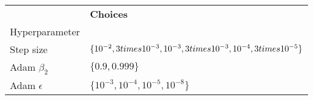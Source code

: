 \begin{tabular}{ll}
 & \bfseries Choices \\
Hyperparameter &  \\
Step size & $\{10^{-2}, 3 \\times 10^{-3}, 10^{-3}, 3 \\times 10^{-3}, 10^{-4}, 3 \\times 10^{-5}\}$ \\
Adam $\beta_2$ & $\{0.9, 0.999\}$ \\
Adam $\epsilon$ & $\{10^{-3}, 10^{-4}, 10^{-5}, 10^{-8}\}$ \\
\end{tabular}
